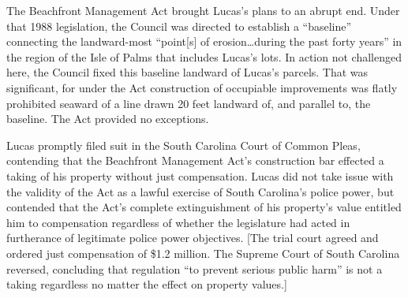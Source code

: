 The Beachfront Management Act brought Lucas's plans to an abrupt end. Under that
1988 legislation, the Council was directed to establish a ``baseline''
connecting the landward-most ``point[s] of erosion\ldots during the past forty
years'' in the region of the Isle of Palms that includes Lucas's lots.
In action not challenged here, the
Council fixed this baseline landward of Lucas's parcels. That was significant,
for under the Act construction of occupiable improvements was flatly prohibited
seaward of a line drawn 20 feet landward of, and parallel to, the baseline.
The Act provided no exceptions.



Lucas promptly filed suit in the South Carolina Court of Common Pleas,
contending that the Beachfront Management Act's construction bar effected a
taking of his property without just compensation. Lucas did not take issue with
the validity of the Act as a lawful exercise of South Carolina's police power,
but contended that the Act's complete extinguishment of his property's value
entitled him to compensation regardless of whether the legislature had acted in
furtherance of legitimate police power objectives.
%
[The trial court agreed and ordered just compensation of \$1.2 million.
The Supreme Court of South Carolina reversed, concluding that regulation ``to
prevent serious public harm'' is not a taking regardless no matter the effect on
property values.]





